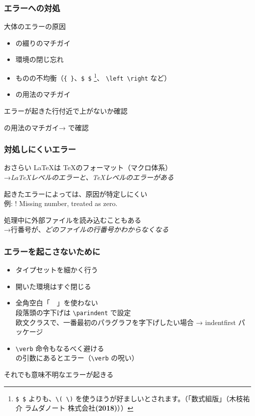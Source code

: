 \begin{frame}
	\frametitle{エラーへの対処}
	\begin{block}{大体のエラーの原因}
		\begin{itemize}
			\item {}の綴りのマチガイ
			\item 環境の閉じ忘れ
			\item ものの不均衡（\texttt{\{ \}}、\texttt{\$ \$}%
				\footnote{\texttt{\$ \$} よりも、\texttt{\textbackslash( \textbackslash)}
				を使うほうが好ましいとされます。（「数式組版」（木枝祐介 ラムダノート
				株式会社\textbf{(2018)}））}、
				\texttt{\textbackslash left \textbackslash right} など）
			\item {}の用法のマチガイ
		\end{itemize}
	\end{block}
	
	エラーが起きた行付近で上がないか確認
	
	の用法のマチガイ→ で確認
\end{frame}

\begin{frame}
	\frametitle{対処しにくいエラー}
	\begin{block}{おさらい}
		\LaTeX は \TeX のフォーマット（マクロ体系）\\
		→\emph{\LaTeX レベルのエラーと、\TeX レベルのエラーがある}
	\end{block}
	起きたエラーによっては、原因が特定しにくい\\
	{\footnotesize 例: {\errorfont ! Missing number, treated as zero.}}
	
	\pause
	処理中に外部ファイルを読み込むこともある\\
	→行番号が、\emph{どのファイルの行番号かわからなくなる}
\end{frame}

\begin{frame}[fragile]
	\frametitle{エラーを起こさないために}
	\begin{itemize}
		\item タイプセットを細かく行う
		\item 開いた環境はすぐ閉じる
		\item 全角空白「　」を使わない\\
			{\footnotesize 段落頭の字下げは \verb+\parindent+ で設定\\
			\tiny 欧文クラスで、一番最初のパラグラフを字下げしたい場合 → indentfirst パッケージ}
		\item \verb+\verb+ 命令もなるべく避ける\\
			{\footnotesize {}の引数にあるとエラー（\verb+\verb+ の呪い）}
	\end{itemize}
	\pause
	それでも意味不明なエラーが起きる
\end{frame}

